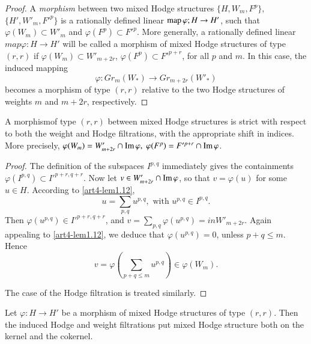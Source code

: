 \begin{proof}
A \textit{morphism} between two mixed Hodge structures $\{H, W_m, F^p\}$,\break $\{H', W'_m, F'^p\}$ is a rationally defined linear $\operatorname{map} \varphi; H \to H'$, such that $\varphi(W_m) \subset W'_m$ and $\varphi (F^p) \subset F'^p$. More generally, a rationally defined linear $map \varphi : H \to H'$ will be called a morphism of mixed Hodge structures of type $(r,r)$ if $\varphi (W_m) \subset W'_{m+2r}$, $\varphi (F^p) \subset F'^{p+r}$, for all $p$ and $m$. In this case, the induced mapping
$$
\varphi: Gr_m (W_\ast) \to Gr_{m+2r} (W'_\ast)
$$
becomes a morphism of type $(r,r)$ relative to the two Hodge structures of weights $m$ and $m+ 2r$, respectively.
\end{proof}

\setcounter{lemma}{12}
\begin{lemma}\label{art4-lem1.13}
A morphism\pageoriginale of type $(r,r)$ between mixed Hodge structures is strict with respect to both the weight and Hodge filtrations, with the appropriate shift in indices. More precisely, $\varphi (W_m) = W'_{m+2r} \cap \operatorname{Im} \varphi, \; \varphi (F^p) = F'^{p+r} \cap \operatorname{Im} \varphi$.
\end{lemma}

\begin{proof}
The definition of the subspaces $I^{p,q}$ immediately gives the containments $\varphi(I^{p,q}) \subset I'^{p+r, q+r}$. Now let $v \in W'_{m+2r} \cap \operatorname{Im} \varphi$, so that $v = \varphi (u)$ for some $u \in H$. According to \ref{art4-lem1.12},
$$
u = \sum_{p,q} u^{p,q}, \text{ with } u^{p,q} \in I^{p,q}.
$$
Then $\varphi (u^{p,q}) \in I'^{p+r , q+r}$, and $v =\sum_{p,q} \varphi (u^{p,q}) =in W'_{m+2r}$. Again appealing to \ref{art4-lem1.12}, we deduce that $\varphi(u^{p,q}) =0$, unless $p+q \leqslant m$. Hence
$$
v = \varphi \left(\sum_{p+q \leq m} u^{p,q} \right) \in \varphi (W_m).
$$

The case of the Hodge filtration is treated similarly.
\end{proof}

\begin{lemma}\label{art4-lem1.14}
Let $\varphi: H \to H'$ be a morphism of mixed Hodge structures of type $(r,r)$. Then the induced Hodge and weight filtrations put mixed Hodge structure both on the kernel and the cokernel.
\end{lemma}

